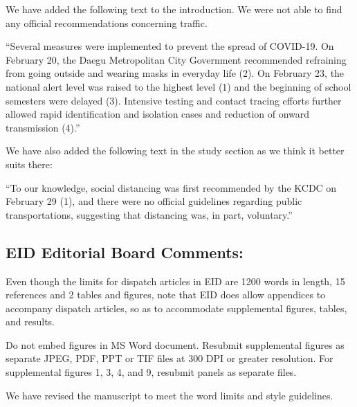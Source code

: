 \documentclass[12pt]{article}
\newcommand{\rev}{\subsection*}
\newcommand{\revtext}{\textsf}
\begin{document}
We have added the following text to the introduction. We were not able to find any official recommendations concerning traffic.

``Several measures were implemented to prevent the spread of COVID-19. On February 20,
the Daegu Metropolitan City Government recommended refraining from going outside and
wearing masks in everyday life (2). On February 23, the national alert level was raised to the
highest level (1) and the beginning of school semesters were delayed (3). Intensive testing and
contact tracing efforts further allowed rapid identification and isolation cases and reduction of
onward transmission (4).''

We have also added the following text in the study section as we think it better suits there:

``To our knowledge, social distancing was first recommended by the KCDC on February 29 (1), and there were no official guidelines regarding public transportations, suggesting that distancing was, in part, voluntary.''

\rev{EID Editorial Board Comments:}

\revtext{Even though the limits for dispatch articles in EID are 1200 words in length, 15 references and 2 tables and figures, note that EID does allow appendices to accompany dispatch articles, so as to accommodate supplemental figures, tables, and results.}

\revtext{Do not embed figures in MS Word document. Resubmit supplemental figures as separate JPEG, PDF, PPT or TIF files at 300 DPI or greater resolution. For supplemental figures 1, 3, 4, and 9, resubmit panels as separate files.}

We have revised the manuscript to meet the word limits and style guidelines.
\end{document}
